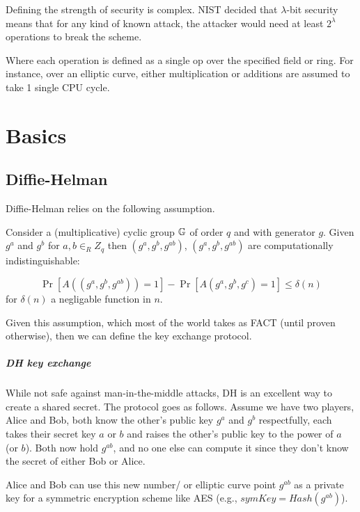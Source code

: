 
\begin{defn}
  Defining the strength of security is complex. NIST decided that $\lambda$-bit security 
  means that for any kind of known attack, the attacker would need at least $2^{\lambda}$
  operations to break the scheme.

  Where each operation is defined as a single op over the specified field or ring.
  For instance, over an elliptic curve, either multiplication or additions are assumed to 
  take 1 single CPU cycle.
  
\end{defn}

\chapter{Basics}
\section{Diffie-Helman}
Diffie-Helman relies on the following assumption.

\begin{defn} \label{DDH}
  Consider a (multiplicative) cyclic group $\mathbb{G}$ of order $q$ and with generator $g$. 
  Given $g^a$ and $g^b$ for $a,b\in_R Z_q$ then $(g^a,g^b,g^{ab})$, $(g^a,g^b,g^{ab})$ are computationally indistinguishable:

  $$ \Pr[A((g^a,g^b,g^{ab}))=1] - \Pr[A(g^a,g^b,g^{c})=1]\le \delta(n)$$
  for $\delta(n)$ a negligable function in $n$.
\end{defn}

Given this assumption, which most of the world takes as FACT (until proven otherwise), then
we can define the key exchange protocol.
\paragraph{DH key exchange}
While not safe against man-in-the-middle attacks, DH is an excellent way to create a shared secret.
The protocol goes as follows.
Assume we have two players, Alice and Bob, both know the other's public key $g^a$ and $g^b$ respectfully,
each takes their secret key $a$ or $b$ and raises the other's public key to the power of $a$ (or $b$).
Both now hold $g^{ab}$, and no one else can compute it since they don't know the secret of either Bob or Alice.

Alice and Bob can use this new number/ or elliptic curve point $g^{ab}$ as a private key for
a symmetric encryption scheme like AES (e.g., $symKey=Hash(g^{ab})$).


